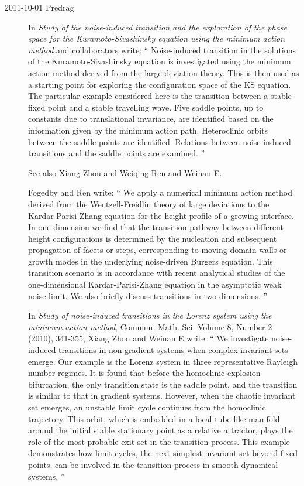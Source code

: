 \begin{description}
\item[2011-10-01 Predrag]
In {\em Study of the noise-induced transition and the exploration of the
  phase space for the {Kuramoto-Sivashinsky} equation using the minimum
  action method}
 and
collaborators write: ``
Noise-induced transition in the solutions of the
  Kuramoto-Sivashinsky equation is investigated using the
  minimum action method derived from the large deviation theory. This is
  then used as a starting point for exploring the configuration space of
  the KS equation. The particular example considered here is the
  transition between a stable fixed point and a stable travelling wave.
  Five saddle points, up to constants due to translational invariance,
  are identified based on the information given by the minimum action
  path. Heteroclinic orbits between the saddle points are identified.
  Relations between noise-induced transitions and the saddle points are
  examined.
''

See also Xiang Zhou and  Weiqing Ren and Weinan E.

Fogedby and Ren write: ``
We apply a numerical minimum action method derived from the
Wentzell-Freidlin theory of large deviations to the Kardar-Parisi-Zhang
equation for the height profile of a growing interface. In one dimension
we find that the transition pathway between different height
configurations is determined by the nucleation and subsequent propagation
of facets or steps, corresponding to moving domain walls or growth modes
in the underlying noise-driven Burgers equation. This transition scenario
is in accordance with recent analytical studies of the one-dimensional
Kardar-Parisi-Zhang equation in the asymptotic weak noise limit. We also
briefly discuss transitions in two dimensions.
''

In {\em Study of noise-induced transitions in the Lorenz system using the
minimum action method},
Commun. Math. Sci. Volume 8, Number 2 (2010), 341-355,
Xiang Zhou and Weinan E write: ``
We investigate noise-induced transitions in non-gradient systems when
complex invariant sets emerge. Our example is the Lorenz system in three
representative Rayleigh number regimes. It is found that before the
homoclinic explosion bifurcation, the only transition state is the saddle
point, and the transition is similar to that in gradient systems.
However, when the chaotic invariant set emerges, an unstable limit cycle
continues from the homoclinic trajectory. This orbit, which is embedded
in a local tube-like manifold around the initial stable stationary point
as a relative attractor, plays the role of the most probable exit set in
the transition process. This example demonstrates how limit cycles, the
next simplest invariant set beyond fixed points, can be involved in the
transition process in smooth dynamical systems.
''


\end{description}
